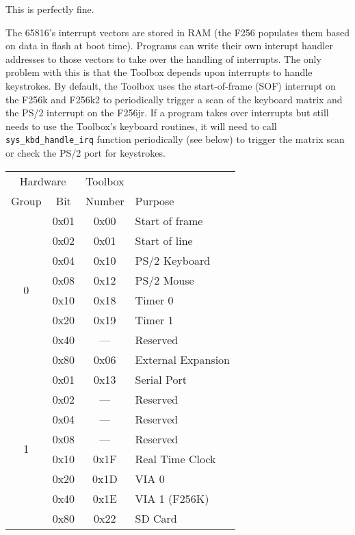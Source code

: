 This is perfectly fine.

The 65816's interrupt vectors are stored in RAM (the F256 populates them based on data in flash at boot time).
Programs can write their own interupt handler addresses to those vectors to take over the handling of interrupts.
The only problem with this is that the Toolbox depends upon interrupts to handle keystrokes.
By default, the Toolbox uses the start-of-frame (SOF) interrupt on the F256k and F256k2 to periodically trigger a
scan of the keyboard matrix and the PS/2 interrupt on the F256jr.
If a program takes over interrupts but still needs to use the Toolbox's keyboard routines, it will need to call
\lstinline!sys_kbd_handle_irq! function periodically (see below) to trigger the matrix scan or check the PS/2 port for keystrokes.

\begin{table}
    \begin{center}
        \begin{tabular}{|c|c||c|l|} \hline 
            \multicolumn{2}{|c||}{Hardware} & Toolbox & \\
            Group & Bit & Number & Purpose \\ \hline
            \multirow{8}{*}{0} & 0x01 & 0x00 & Start of frame \\ \cline{2-4}
                & 0x02 & 0x01 & Start of line \\ \cline{2-4}
                & 0x04 & 0x10 & PS/2 Keyboard \\ \cline{2-4}
                & 0x08 & 0x12 & PS/2 Mouse \\ \cline{2-4}
                & 0x10 & 0x18 & Timer 0 \\ \cline{2-4}
                & 0x20 & 0x19 & Timer 1 \\ \cline{2-4}
                & 0x40 & ---  & Reserved \\ \cline{2-4}
                & 0x80 & 0x06 & External Expansion \\ \hline\hline

            \multirow{8}{*}{1} & 0x01 & 0x13 & Serial Port \\ \cline{2-4}
                & 0x02 & ---  & Reserved \\ \cline{2-4}
                & 0x04 & ---  & Reserved \\ \cline{2-4}
                & 0x08 & ---  & Reserved \\ \cline{2-4}
                & 0x10 & 0x1F & Real Time Clock \\ \cline{2-4}
                & 0x20 & 0x1D & VIA 0 \\ \cline{2-4}
                & 0x40 & 0x1E & VIA 1 (F256K) \\ \cline{2-4}
                & 0x80 & 0x22 & SD Card \\ \hline\hline


\end{tabular}
\end{center}
\end{table}
